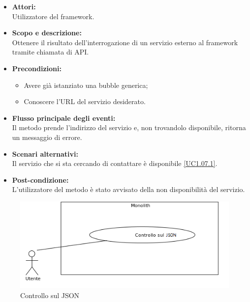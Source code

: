 \begin{itemize}
	\item \textbf{Attori:}
	\\Utilizzatore del framework.
	\item \textbf{Scopo e descrizione:} 
	\\Ottenere il risultato dell'interrogazione di un servizio esterno al framework tramite chiamata di API.
	\item \textbf{Precondizioni:}
	\begin{itemize}
		\item Avere già istanziato una bubble generica;
		\item Conoscere l'URL del servizio desiderato.
	\end{itemize}
	\item \textbf{Flusso principale degli eventi:}
	\\Il metodo prende l'indirizzo del servizio e, non trovandolo disponibile, ritorna un messaggio di errore.
	\item \textbf{Scenari alternativi:}
	\\Il servizio che si sta cercando di contattare è disponibile \ref{UC1.07.1}.
	\item \textbf{Post-condizione:}
	\\L'utilizzatore del metodo è stato avvisato della non disponibilità del servizio.
\end{itemize}


\begin{figure}[H]
	\centering
	\includegraphics[width=15cm]{../../documenti/AnalisiDeiRequisiti/Diagrammi_img/uc1_12.png}
	\caption{\UCCaption{} Controllo sul JSON}
\end{figure}

